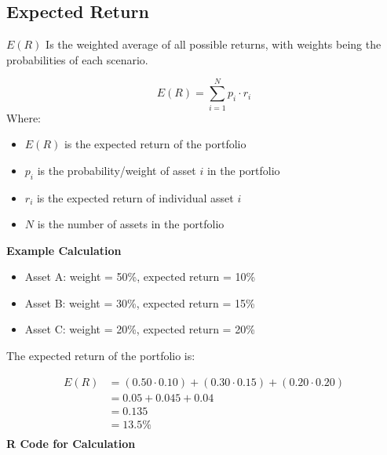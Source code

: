 \documentclass[
]{book}
\providecommand{\tightlist}{%
  \setlength{\itemsep}{0pt}\setlength{\parskip}{0pt}}
\begin{document}
\hypertarget{expected-return}{%
\subsection{Expected Return}\label{expected-return}}

\(E(R)\) Is the weighted average of all possible returns, with weights
being the probabilities of each scenario.

\[
E(R) = \sum_{i=1}^{N} p_i \cdot r_i
\] Where:

\begin{itemize}
\tightlist
\item
  \(E(R)\) is the expected return of the portfolio
\item
  \(p_i\) is the probability/weight of asset \(i\) in the portfolio
\item
  \(r_i\) is the expected return of individual asset \(i\)
\item
  \(N\) is the number of assets in the portfolio
\end{itemize}

\textbf{Example Calculation}

\begin{itemize}
\tightlist
\item
  Asset A: weight = 50\%, expected return = 10\%
\item
  Asset B: weight = 30\%, expected return = 15\%
\item
  Asset C: weight = 20\%, expected return = 20\%
\end{itemize}

The expected return of the portfolio is:

\[
\begin{aligned}
E(R) &= (0.50 \cdot 0.10) + (0.30 \cdot 0.15) + (0.20 \cdot 0.20) \\
       &= 0.05 + 0.045 + 0.04 \\
       &= 0.135 \\
       &= 13.5\% \\  
\end{aligned}
\] \textbf{R Code for Calculation}
\end{document}
